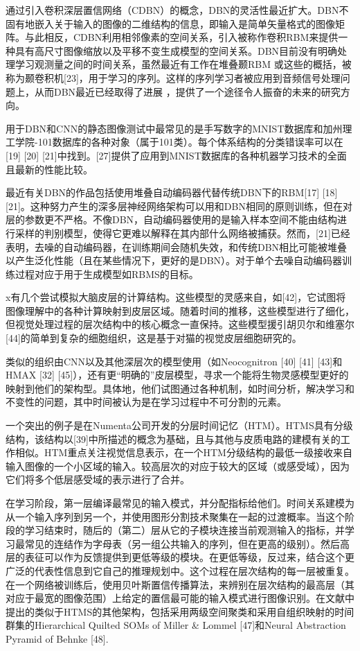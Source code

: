通过引入卷积深层置信网络（CDBN）的概念，DBN的灵活性最近扩大。DBN不固有地嵌入关于输入的图像的二维结构的信息，即输入是简单矢量格式的图像矩阵。与此相反，CDBN利用相邻像素的空间关系，引入被称作卷积RBM来提供一种具有高尺寸图像缩放以及平移不变生成模型的空间关系。DBN目前没有明确处理学习观测量之间的时间关系，虽然最近有工作在堆叠颞RBM 或这些的概括，被称为颞卷积机[23]，用于学习的序列。这样的序列学习者被应用到音频信号处理问题上，从而DBN最近已经取得了进展 ，提供了一个途径令人振奋的未来的研究方向。

用于DBN和CNN的静态图像测试中最常见的是手写数字的MNIST数据库和加州理工学院-101数据库的各种对象（属于101类）。每个体系结构的分类错误率可以在[19] [20] [21]中找到。[27]提供了应用到MNIST数据库的各种机器学习技术的全面且最新的性能比较。

最近有关DBN的作品包括使用堆叠自动编码器代替传统DBN下的RBM[17] [18] [21]。这种努力产生的深多层神经网络架构可以用和DBN相同的原则训练，但在对层的参数更不严格。不像DBN，自动编码器使用的是输入样本空间不能由结构进行采样的判别模型，使得它更难以解释在其内部什么网络被捕获。然而，[21]已经表明，去噪的自动编码器，在训练期间会随机失效，和传统DBN相比可能被堆叠以产生泛化性能（且在某些情况下，更好的是DBN）。对于单个去噪自动编码器训练过程对应于用于生成模型如RBMS的目标。

x有几个尝试模拟大脑皮层的计算结构。这些模型的灵感来自，如[42]，它试图将图像理解中的各种计算映射到皮层区域。随着时间的推移，这些模型进行了细化，但视觉处理过程的层次结构中的核心概念一直保持。这些模型援引胡贝尔和维塞尔[44]的简单到复杂的细胞组织，这是基于对猫的视觉皮层细胞研究的。

类似的组织由CNN以及其他深层次的模型使用（如Neocognitron [40] [41] [43]和HMAX [32] [45]），还有更“明确的”皮层模型，寻求一个能将生物灵感模型更好的映射到他们的架构型。具体地，他们试图通过各种机制，如时间分析，解决学习和不变性的问题，其中时间被认为是在学习过程中不可分割的元素。

一个突出的例子是在Numenta公司开发的分层时间记忆（HTM）。HTMS具有分级结构，该结构以[39]中所描述的概念为基础，且与其他与皮质电路的建模有关的工作相似。HTM重点关注视觉信息表示，在一个HTM分级结构的最低一级接收来自输入图像的一个小区域的输入。较高层次的对应于较大的区域（或感受域），因为它们将多个低层感受域的表示进行了合并。

在学习阶段，第一层编译最常见的输入模式，并分配指标给他们。时间关系建模为从一个输入序列到另一个，并使用图形分割技术聚集在一起的过渡概率。当这个阶段的学习结束时，随后的（第二）层从它的子模块连接当前观测输入的指标，并学习最常见的连结作为字母表（另一组公共输入的序列，但在更高的级别）。然后高层的表征可以作为反馈提供到更低等级的模块。在更低等级，反过来，结合这个更广泛的代表性信息到它自己的推理规划中。这个过程在层次结构的每一层被重复。在一个网络被训练后，使用贝叶斯置信传播算法，来辨别在层次结构的最高层（其对应于最宽的图像范围）上给定的置信最可能的输入模式进行图像识别。在文献中提出的类似于HTMS的其他架构，包括采用两级空间聚类和采用自组织映射的时间群集的Hierarchical Quilted SOMs of Miller \& Lommel [47]和Neural Abstraction Pyramid of Behnke [48].

